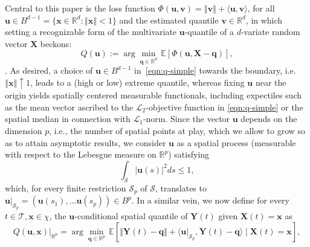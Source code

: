 \documentclass[aos]{imsart}
\theoremstyle{plain}
\theoremstyle{remark}
\def\E{\mathbb{E}}
\def\R{\mathbb{R}}
\newcommand{\Lcal}{\mathcal{L}}
\newcommand{\Scal}{\mathcal{S}}
\newcommand{\Tcal}{\mathcal{T}}
\newcommand{\norm}[1]{\left\Vert #1 \right\Vert}
\newcommand{\bb}[1]{\boldsymbol{#1}}
\begin{document}
Central to this paper is the loss function $\Phi(\bb{u}, \bb{v}) = \norm{\bb{v}} + \langle \bb{u}, \bb{v}\rangle$, for all $\bb{u} \in B^{d-1} = \{ \bb{x} \in \R^d : \norm{\bb{x}} < 1 \}$ and the estimated quantile $\bb{v} \in \R^d$, in which setting a recognizable form of the  multivariate $\bb{u}$-quantile of a $d$-variate random vector $\bb{X}$ beckons: 
\begin{equation}\label{eqn:q-simple}
    Q(\bb{u}) := \arg\min_{\bb{q} \in \R^d} \, \E\left[ \Phi(\bb{u}, \bb{X} - \bb{q}) \right],
\end{equation}
\citep[cf.][p.397]{ChowChau19}. As desired, a choice of $\bb{u} \in B^{d-1}$ in~\eqref{eqn:q-simple} towards the boundary, i.e. $\norm{\bb{x}} \uparrow 1$, leads to a (high or low) extreme quantile, whereas fixing $\bb{u}$ near the origin yields spatially centered measurable functionals, including expectiles such as the mean vector ascribed to the $\Lcal_2$-objective function in \eqref{eqn:q-simple} or the spatial median in connection with $\Lcal_1$-norm. Since the vector $\bb{u}$ depends on the dimension $p$, i.e., the number of spatial points at play, which we allow to grow so as to attain asymptotic results, we consider $\bb{u}$ as a spatial process (measurable with respect to the Lebesgue measure on $\R^p$) satisfying
\begin{equation*}
    \int_{\Scal} \vert \bb{u}(s) \vert^2 ds \leqslant 1,
\end{equation*}
which, for every finite restriction $\Scal_p$ of $\Scal$, translates to $\bb{u}\vert_{\Scal_p} = (\bb{u}(s_1), \dots \bb{u}(s_p)) \in B^p$. In a similar vein, we now define for every $t \in \Tcal, \bb{x} \in \chi$, the $\bb{u}$-conditional spatial quantile of $\bb{Y}(t)$ given $\bb{X}(t) = \bb{x}$ as
\begin{equation}\label{eqn:parameter}
    Q(\bb{u} ,\bb{x} )\vert_{\R^p} = \arg\min_{\bb{q}\in \R^p} \, \E\left[ \Vert \bb{Y}(t) - \bb{q}\Vert +  \langle \bb{u}\vert_{\Scal_p}, \bb{Y}(t) - \bb{q} \rangle \mid \bb{X}(t) = \bb{x}\right],
\end{equation}
\end{document}
